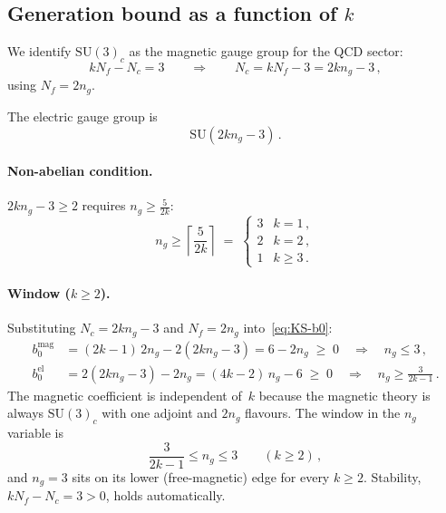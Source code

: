 \documentclass[11pt,a4paper]{article}
\theoremstyle{plain}
\theoremstyle{definition}
\theoremstyle{remark}
\newcommand{\Nc}{N_{\!c}}
\newcommand{\Nf}{N_{\!f}}
\newcommand{\ngen}{n_g}
\newcommand{\SU}[1]{\mathrm{SU}(#1)}
\begin{document}
\subsection{Generation bound as a function of $k$}

We identify $\SU{3}_c$ as the magnetic gauge group for the QCD sector:
\begin{equation}
  k\Nf - \Nc = 3
  \qquad\Longrightarrow\qquad
  \Nc = k\Nf - 3 = 2k\ngen - 3\,,
\end{equation}
using $\Nf = 2\ngen$.

The electric gauge group is
\begin{equation}\label{eq:KS-electric}
  \SU{2k\ngen - 3}\,.
\end{equation}

\paragraph{Non-abelian condition.}
$2k\ngen - 3 \geq 2$ requires $\ngen \geq \frac{5}{2k}$:
\begin{equation}\label{eq:KS-bound}
  \ngen \geq \left\lceil \frac{5}{2k} \right\rceil
  \;=\; \begin{cases}
    3 & k = 1\,, \\
    2 & k = 2\,, \\
    1 & k \geq 3\,.
  \end{cases}
\end{equation}

\paragraph{Window ($k \geq 2$).}
Substituting $\Nc = 2k\ngen - 3$ and $\Nf = 2\ngen$
into~\eqref{eq:KS-b0}:
\begin{align}
  b_0^{\mathrm{mag}} &= (2k - 1)\,2\ngen - 2(2k\ngen - 3)
  = 6 - 2\ngen \;\geq\; 0
  \quad\Longrightarrow\quad
  \ngen \leq 3\,,
  \label{eq:KS-lower} \\
  b_0^{\mathrm{el}} &= 2(2k\ngen - 3) - 2\ngen
  = (4k - 2)\,\ngen - 6 \;\geq\; 0
  \quad\Longrightarrow\quad
  \ngen \geq \frac{3}{2k - 1}\,.
  \label{eq:KS-upper}
\end{align}
The magnetic coefficient is independent of~$k$ because the magnetic
theory is always $\SU{3}_c$ with one adjoint and $2\ngen$ flavours.  The
window in the $\ngen$ variable is
\begin{equation}\label{eq:KS-CW-ng}
  \frac{3}{2k - 1} \leq \ngen \leq 3
  \qquad (k \geq 2)\,,
\end{equation}
and $\ngen = 3$ sits on its lower (free-magnetic) edge for every
$k \geq 2$.  Stability, $k\Nf - \Nc = 3 > 0$, holds automatically.
\end{document}
